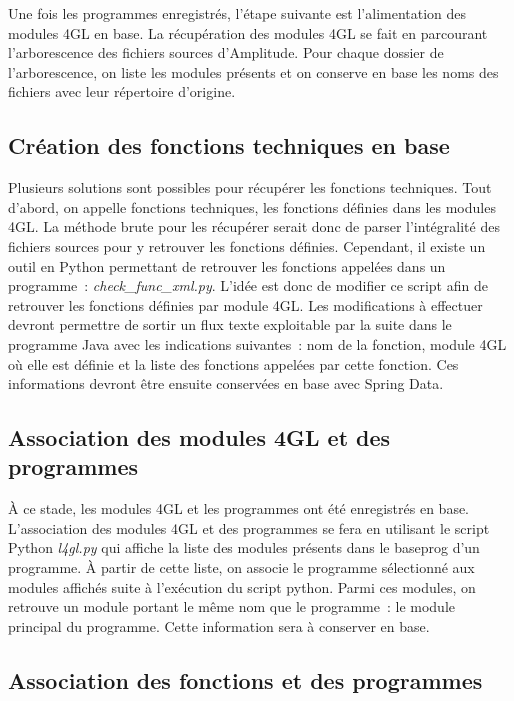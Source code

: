 \documentclass{polytech/polytech}
\begin{document}
Une fois les programmes enregistrés, l’étape suivante est l’alimentation des modules 4GL en base. La récupération des modules 4GL se fait en parcourant l’arborescence des fichiers sources d’Amplitude. Pour chaque dossier de l’arborescence, on liste les modules présents et on conserve en base les noms des fichiers avec leur répertoire d’origine. 


\subsection{Création des fonctions techniques en base}


Plusieurs solutions sont possibles pour récupérer les fonctions techniques. Tout d’abord, on appelle fonctions techniques, les fonctions définies dans les modules 4GL. La méthode brute pour les récupérer serait donc de parser l’intégralité des fichiers sources pour y retrouver les fonctions définies. Cependant, il existe un outil en Python permettant de retrouver les fonctions appelées dans un programme : \textit{check\_func\_xml.py}. L’idée est donc de modifier ce script afin de retrouver les fonctions définies par module 4GL. Les modifications à effectuer devront permettre de sortir un flux texte exploitable par la suite dans le programme Java avec les indications suivantes : nom de la fonction, module 4GL où elle est définie et la liste des fonctions appelées par cette fonction. Ces informations devront être ensuite conservées en base avec Spring Data. 


\subsection{Association des modules 4GL et des programmes}

À ce stade, les modules 4GL et les programmes ont été enregistrés en base. L’association des modules 4GL et des programmes se fera en utilisant le script Python \textit{l4gl.py} qui affiche la liste des modules présents dans le baseprog d’un programme. À partir de cette liste, on associe le programme sélectionné aux modules affichés suite à l’exécution du script python. Parmi ces modules, on retrouve un module portant le même nom que le programme : le module principal du programme. Cette information sera à conserver en base. 


\subsection{Association des fonctions et des programmes}
\end{document}
